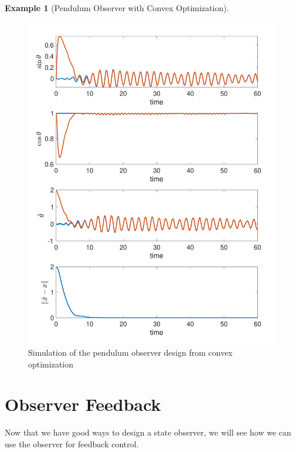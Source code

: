 \documentclass[
]{book}
\theoremstyle{definition}
\theoremstyle{definition}
\newtheorem{example}{Example}[chapter]
\theoremstyle{definition}
\theoremstyle{definition}
\theoremstyle{remark}
\begin{document}
\begin{example}[Pendulum Observer with Convex Optimization]
\begin{figure}

{\centering \includegraphics[width=0.8\linewidth]{images/pendulum-simulation-sos-observer} 

}

\caption{Simulation of the pendulum observer design from convex optimization}\label{fig:sos-observer-pendulum-simulation}
\end{figure}

\end{example}

\hypertarget{observer-feedback}{%
\section{Observer Feedback}\label{observer-feedback}}

Now that we have good ways to design a state observer, we will see how we can use the observer for feedback control.
\end{document}
